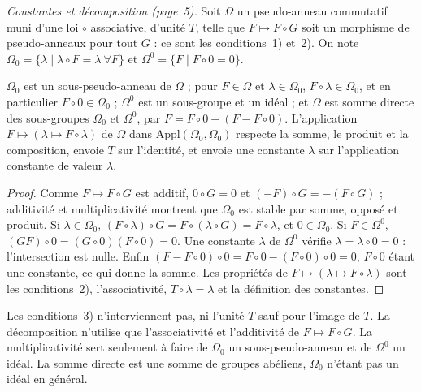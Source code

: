 \medskip
\noindent\textit{Constantes et décomposition (page~5).} Soit $\Omega$ un pseudo-anneau commutatif muni d'une loi $\circ$ associative, d'unité $T$, telle que $F \mapsto F \circ G$ soit un morphisme de pseudo-anneaux pour tout $G$ : ce sont les conditions~1) et~2). On note $\Omega_0 = \{\lambda \mid \lambda \circ F = \lambda \ \forall F\}$ et $\Omega^0 = \{F \mid F \circ 0 = 0\}$.

\begin{enonce}[Page 5, $\Omega = \Omega_0 \oplus \Omega^0$]
$\Omega_0$ est un sous-pseudo-anneau de $\Omega$ ; pour $F \in \Omega$ et $\lambda \in \Omega_0$, $F \circ \lambda \in \Omega_0$, et en particulier $F \circ 0 \in \Omega_0$ ; $\Omega^0$ est un sous-groupe et un idéal ; et $\Omega$ est somme directe des sous-groupes $\Omega_0$ et $\Omega^0$, par $F = F \circ 0 + (F - F \circ 0)$. L'application $F \mapsto (\lambda \mapsto F \circ \lambda)$ de $\Omega$ dans $\mathrm{Appl}(\Omega_0, \Omega_0)$ respecte la somme, le produit et la composition, envoie $T$ sur l'identité, et envoie une constante $\lambda$ sur l'application constante de valeur $\lambda$.
\end{enonce}

\begin{proof}
Comme $F \mapsto F \circ G$ est additif, $0 \circ G = 0$ et $(-F) \circ G = -(F \circ G)$ ; additivité et multiplicativité montrent que $\Omega_0$ est stable par somme, opposé et produit. Si $\lambda \in \Omega_0$, $(F \circ \lambda) \circ G = F \circ (\lambda \circ G) = F \circ \lambda$, et $0 \in \Omega_0$. Si $F \in \Omega^0$, $(GF) \circ 0 = (G \circ 0)(F \circ 0) = 0$. Une constante $\lambda$ de $\Omega^0$ vérifie $\lambda = \lambda \circ 0 = 0$ : l'intersection est nulle. Enfin $(F - F \circ 0) \circ 0 = F \circ 0 - (F \circ 0) \circ 0 = 0$, $F \circ 0$ étant une constante, ce qui donne la somme. Les propriétés de $F \mapsto (\lambda \mapsto F \circ \lambda)$ sont les conditions~2), l'associativité, $T \circ \lambda = \lambda$ et la définition des constantes.
\end{proof}

\begin{remarque}
Les conditions~3) n'interviennent pas, ni l'unité $T$ sauf pour l'image de $T$. La décomposition n'utilise que l'associativité et l'additivité de $F \mapsto F \circ G$. La multiplicativité sert seulement à faire de $\Omega_0$ un sous-pseudo-anneau et de $\Omega^0$ un idéal. La somme directe est une somme de groupes abéliens, $\Omega_0$ n'étant pas un idéal en général.
\end{remarque}

